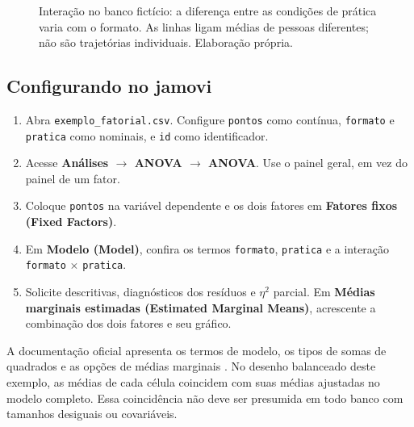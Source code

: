 \begin{figure}[H]
\centering
{}
\caption{Interação no banco fictício: a diferença entre as condições de prática varia com o formato. As linhas ligam médias de pessoas diferentes; não são trajetórias individuais. Elaboração própria.}
\label{fig:interacao-fatorial}
\end{figure}

\subsection{Configurando no jamovi}

\begin{enumerate}
  \item Abra \texttt{exemplo\_fatorial.csv}. Configure \texttt{pontos} como contínua, \texttt{formato} e \texttt{pratica} como nominais, e \texttt{id} como identificador.
  \item Acesse \textbf{Análises $\rightarrow$ ANOVA $\rightarrow$ ANOVA}. Use o painel geral, em vez do painel de um fator.
  \item Coloque \texttt{pontos} na variável dependente e os dois fatores em \textbf{Fatores fixos (Fixed Factors)}.
  \item Em \textbf{Modelo (Model)}, confira os termos \texttt{formato}, \texttt{pratica} e a interação \texttt{formato} $\times$ \texttt{pratica}.
  \item Solicite descritivas, diagnósticos dos resíduos e $\eta^2$ parcial. Em \textbf{Médias marginais estimadas (Estimated Marginal Means)}, acrescente a combinação dos dois fatores e seu gráfico.
\end{enumerate}

A documentação oficial apresenta os termos de modelo, os tipos de somas de quadrados e as opções de médias marginais \parencite{JamoviAnovaFatorial}. No desenho balanceado deste exemplo, as médias de cada célula coincidem com suas médias ajustadas no modelo completo. Essa coincidência não deve ser presumida em todo banco com tamanhos desiguais ou covariáveis.

